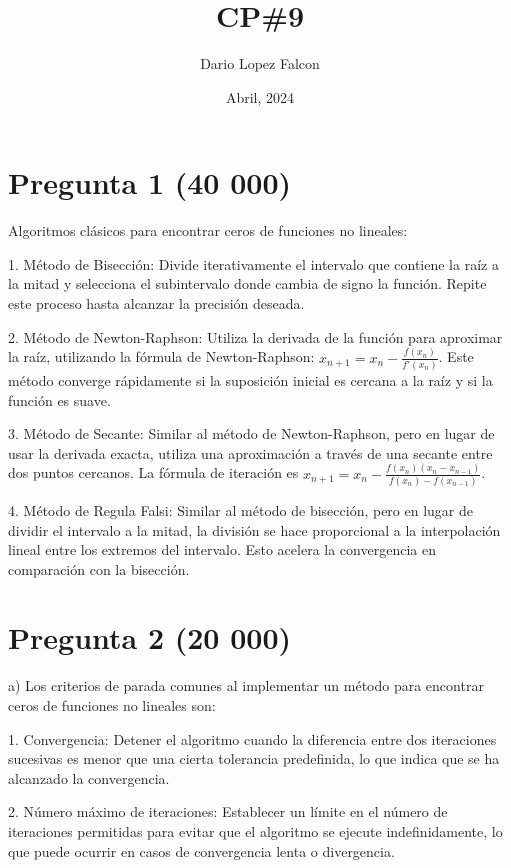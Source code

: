 \documentclass[a4paper,12pt]{article}
\begin{document}
\title{CP\#9}
\author{Dario Lopez Falcon}
\date{Abril, 2024}
\maketitle

\section*{Pregunta 1 (40 000)}
Algoritmos clásicos para encontrar ceros de funciones no lineales:

1. Método de Bisección: Divide iterativamente el intervalo que contiene la raíz a la mitad y selecciona el subintervalo donde cambia de signo la función. Repite este proceso hasta alcanzar la precisión deseada.

2. Método de Newton-Raphson: Utiliza la derivada de la función para aproximar la raíz, utilizando la fórmula de Newton-Raphson: \( x_{n+1} = x_n - \frac{f(x_n)}{f'(x_n)} \). Este método converge rápidamente si la suposición inicial es cercana a la raíz y si la función es suave.

3. Método de Secante: Similar al método de Newton-Raphson, pero en lugar de usar la derivada exacta, utiliza una aproximación a través de una secante entre dos puntos cercanos. La fórmula de iteración es \( x_{n+1} = x_n - \frac{f(x_n)(x_n - x_{n-1})}{f(x_n) - f(x_{n-1})} \).

4. Método de Regula Falsi: Similar al método de bisección, pero en lugar de dividir el intervalo a la mitad, la división se hace proporcional a la interpolación lineal entre los extremos del intervalo. Esto acelera la convergencia en comparación con la bisección.


\section*{Pregunta 2 (20 000)}
a) Los criterios de parada comunes al implementar un método para encontrar ceros de funciones no lineales son:

1. Convergencia: Detener el algoritmo cuando la diferencia entre dos iteraciones sucesivas es menor que una cierta tolerancia predefinida, lo que indica que se ha alcanzado la convergencia.

2. Número máximo de iteraciones: Establecer un límite en el número de iteraciones permitidas para evitar que el algoritmo se ejecute indefinidamente, lo que puede ocurrir en casos de convergencia lenta o divergencia.
\end{document}
